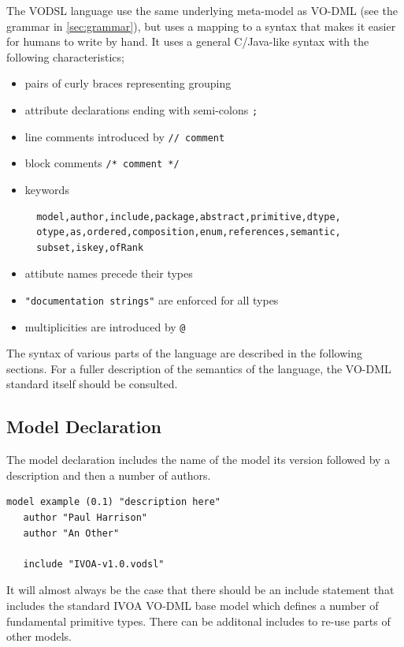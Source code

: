 \documentclass[11pt,a4paper]{ivoa}
\begin{document}
The VODSL language use the same underlying meta-model as VO-DML (see the grammar in \ref{sec:grammar}), but uses a mapping to a syntax that makes it easier
for humans to write by hand. It uses a general C/Java-like syntax with the following characteristics;

\begin{itemize}
  \item pairs of curly braces representing grouping
  \item attribute declarations ending with semi-colons \lstinline{;}
  \item line comments introduced by \lstinline{// comment}
  \item block comments \lstinline{/* comment */}
  \item keywords \begin{lstlisting}
  model,author,include,package,abstract,primitive,dtype,
  otype,as,ordered,composition,enum,references,semantic,
  subset,iskey,ofRank
  \end{lstlisting}
  \item attibute names precede their types
  \item \lstinline{"documentation strings"} are enforced for all types
  \item multiplicities are introduced by \lstinline{@}
\end{itemize}

The syntax of various parts of the language are described in the following sections. For a fuller description of the 
semantics of the language, the VO-DML standard itself should be consulted.


\subsection{Model Declaration}
The model declaration includes the name of the model its version followed by a description and then a number of authors.
\begin{lstlisting}[language=vodsl]
 model example (0.1) "description here" 
   author "Paul Harrison"
   author "An Other"
   
   include "IVOA-v1.0.vodsl"

\end{lstlisting}

It will almost always be the case that there should be an include statement that includes the standard IVOA VO-DML base model which defines a 
number of fundamental primitive types. There can be additonal includes to re-use parts of other models.
\end{document}

